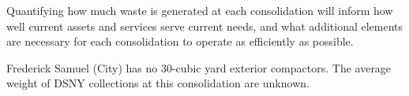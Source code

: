 
    Quantifying how much waste is generated at each consolidation will inform how well current assets and services serve current needs, and what additional elements are necessary for each consolidation to operate as efficiently as possible.
    
    Frederick Samuel (City) has no 30-cubic yard exterior compactors. The average weight of DSNY collections at this consolidation are unknown.